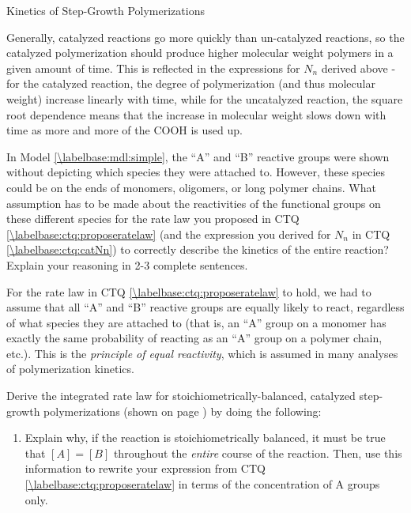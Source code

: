\begin{activity}{Kinetics of Step-Growth Polymerizations}
\begin{ctqs}
		\begin{solution}[2in]{}
		
			Generally, catalyzed reactions go more quickly than un-catalyzed reactions, so the catalyzed polymerization should produce higher molecular weight polymers in a given amount of time.  This is reflected in the expressions for $N_n$ derived above - for the catalyzed reaction, the degree of polymerization (and thus molecular weight) increase linearly with time, while for the uncatalyzed reaction, the square root dependence means that the increase in molecular weight slows down with time as more and more of the COOH is used up.
		\end{solution}

\end{ctqs}
	

\begin{exercises}

		\exercise In Model \ref{\labelbase:mdl:simple}, the ``A'' and ``B'' reactive groups were shown without depicting which species they were attached to.  However, these species could be on the ends of monomers, oligomers, or long polymer chains. %
		What assumption has to be made about the reactivities of the functional groups on these different species for the rate law you proposed in CTQ \ref{\labelbase:ctq:proposeratelaw} (and the expression you derived for $N_n$ in CTQ \ref{\labelbase:ctq:catNn}) to correctly describe the kinetics of the entire reaction?  Explain your reasoning in 2-3 complete sentences.
		
			\begin{solution}{}
				For the rate law in CTQ \ref{\labelbase:ctq:proposeratelaw} to hold, we had to assume that all ``A'' and ``B'' reactive groups are equally likely to react, regardless of what species they are attached to (that is, an ``A'' group on a monomer has exactly the same probability of reacting as an ``A'' group on a polymer chain, etc.).  This is the \emph{principle of equal reactivity}, which is assumed in many analyses of polymerization kinetics.
			\end{solution}
			
		\exercise Derive the integrated rate law for stoichiometrically-balanced, catalyzed step-growth polymerizations (shown on page \pageref{\labelbase:infobox:catintegrated}) by doing the following: \label{\labelbase:exc:catinteratelaw}
		
			\begin{enumerate}
				\item Explain why, if the reaction is stoichiometrically balanced, it must be true that $[A]=[B]$ throughout the \emph{entire} course of the reaction.  Then, use this information to rewrite your expression from CTQ \ref{\labelbase:ctq:proposeratelaw} in terms of the concentration of A groups only.
				

\end{enumerate}
\end{exercises}
\end{activity}
